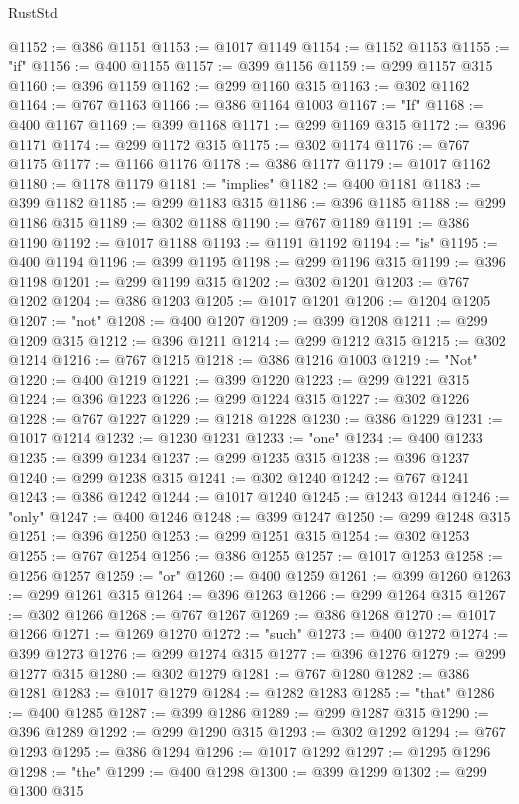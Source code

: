 \begin{lexlean}{RustStd}
\begin{coremodule}
@1152 := @386 @1151
@1153 := @1017 @1149
@1154 := @1152 @1153
@1155 := "if"
@1156 := @400 @1155
@1157 := @399 @1156
@1159 := @299 @1157 @315
@1160 := @396 @1159
@1162 := @299 @1160 @315
@1163 := @302 @1162
@1164 := @767 @1163
@1166 := @386 @1164 @1003
@1167 := "If"
@1168 := @400 @1167
@1169 := @399 @1168
@1171 := @299 @1169 @315
@1172 := @396 @1171
@1174 := @299 @1172 @315
@1175 := @302 @1174
@1176 := @767 @1175
@1177 := @1166 @1176
@1178 := @386 @1177
@1179 := @1017 @1162
@1180 := @1178 @1179
@1181 := "implies"
@1182 := @400 @1181
@1183 := @399 @1182
@1185 := @299 @1183 @315
@1186 := @396 @1185
@1188 := @299 @1186 @315
@1189 := @302 @1188
@1190 := @767 @1189
@1191 := @386 @1190
@1192 := @1017 @1188
@1193 := @1191 @1192
@1194 := "is"
@1195 := @400 @1194
@1196 := @399 @1195
@1198 := @299 @1196 @315
@1199 := @396 @1198
@1201 := @299 @1199 @315
@1202 := @302 @1201
@1203 := @767 @1202
@1204 := @386 @1203
@1205 := @1017 @1201
@1206 := @1204 @1205
@1207 := "not"
@1208 := @400 @1207
@1209 := @399 @1208
@1211 := @299 @1209 @315
@1212 := @396 @1211
@1214 := @299 @1212 @315
@1215 := @302 @1214
@1216 := @767 @1215
@1218 := @386 @1216 @1003
@1219 := "Not"
@1220 := @400 @1219
@1221 := @399 @1220
@1223 := @299 @1221 @315
@1224 := @396 @1223
@1226 := @299 @1224 @315
@1227 := @302 @1226
@1228 := @767 @1227
@1229 := @1218 @1228
@1230 := @386 @1229
@1231 := @1017 @1214
@1232 := @1230 @1231
@1233 := "one"
@1234 := @400 @1233
@1235 := @399 @1234
@1237 := @299 @1235 @315
@1238 := @396 @1237
@1240 := @299 @1238 @315
@1241 := @302 @1240
@1242 := @767 @1241
@1243 := @386 @1242
@1244 := @1017 @1240
@1245 := @1243 @1244
@1246 := "only"
@1247 := @400 @1246
@1248 := @399 @1247
@1250 := @299 @1248 @315
@1251 := @396 @1250
@1253 := @299 @1251 @315
@1254 := @302 @1253
@1255 := @767 @1254
@1256 := @386 @1255
@1257 := @1017 @1253
@1258 := @1256 @1257
@1259 := "or"
@1260 := @400 @1259
@1261 := @399 @1260
@1263 := @299 @1261 @315
@1264 := @396 @1263
@1266 := @299 @1264 @315
@1267 := @302 @1266
@1268 := @767 @1267
@1269 := @386 @1268
@1270 := @1017 @1266
@1271 := @1269 @1270
@1272 := "such"
@1273 := @400 @1272
@1274 := @399 @1273
@1276 := @299 @1274 @315
@1277 := @396 @1276
@1279 := @299 @1277 @315
@1280 := @302 @1279
@1281 := @767 @1280
@1282 := @386 @1281
@1283 := @1017 @1279
@1284 := @1282 @1283
@1285 := "that"
@1286 := @400 @1285
@1287 := @399 @1286
@1289 := @299 @1287 @315
@1290 := @396 @1289
@1292 := @299 @1290 @315
@1293 := @302 @1292
@1294 := @767 @1293
@1295 := @386 @1294
@1296 := @1017 @1292
@1297 := @1295 @1296
@1298 := "the"
@1299 := @400 @1298
@1300 := @399 @1299
@1302 := @299 @1300 @315

\end{coremodule}
\end{lexlean}

